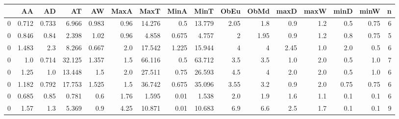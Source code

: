\begin{tabular}{lrrrrrrrrrrrrrrr}
\toprule
{} &     AA &     AD &     AT &     AW &  MaxA &    MaxT &  MinA &    MinT &  ObEu &  ObMd &  maxD &  maxW &  minD &  minW &  n \\
\midrule
0 &  0.712 &  0.733 &  6.966 &  0.983 &  0.96 &  14.276 &   0.5 &  13.779 &    2.05 &    1.8 &   0.9 &   1.2 &   0.5 &  0.75 &  6 \\
0 &  0.846 &  0.84 &  2.398 &  1.02 &  0.96 &  4.858 &  0.675 &  4.757 &    2 &    1.95 &   0.9 &   1.2 &   0.8 &  0.75 &  5 \\
0 &  1.483 &  2.3 &  8.266 &  0.667 &   2.0 &  17.542 &  1.225 &  15.944 &    4 &    4 &  2.45 &   1.0 &   2.0 &   0.5 &  6 \\
0 &  1.0 &  0.714 &  32.125 &  1.357 &   1.5 &  66.116 &   0.5 &  63.712 &    3.5 &    3.5 &   1.0 &   2.0 &   0.5 &   1.0 &  7 \\
0 &  1.25 &  1.0 &  13.448 &  1.5 &   2.0 &  27.511 &  0.75 &  26.593 &    4.5 &    4 &   2.0 &   2.0 &   0.5 &   1.0 &  6 \\
0 &  1.182 &  0.792 &  17.753 &  1.525 &   1.5 &  36.742 &  0.675 &  35.096 &    3.55 &    3.2 &   0.9 &   2.0 &  0.75 &  0.75 &  6 \\
0 &  0.685 &  0.85 &  0.781 &  0.6 &  1.76 &  1.595 &  0.01 &  1.538 &    2.0 &    1.9 &   1.6 &   1.1 &   0.1 &   0.1 &  6 \\
0 &  1.57 &  1.3 &  5.369 &  0.9 &  4.25 &  10.871 &  0.01 &  10.683 &    6.9 &    6.6 &   2.5 &   1.7 &   0.1 &   0.1 &  9 \\
\bottomrule
\end{tabular}
